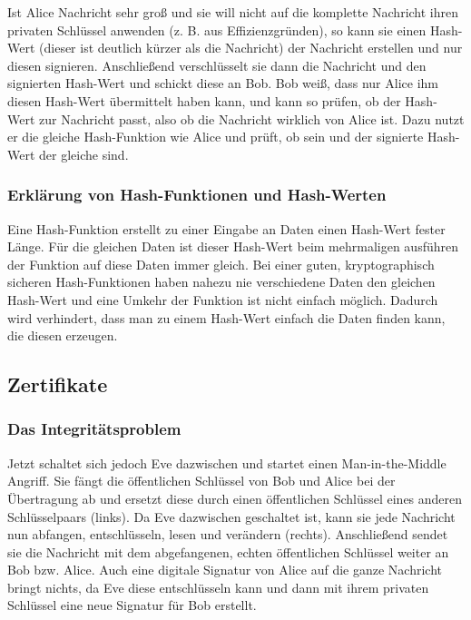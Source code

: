 Ist Alice Nachricht sehr groß und sie will nicht auf die komplette Nachricht
ihren privaten Schlüssel anwenden (z. B. aus Effizienzgründen), so kann sie
einen Hash-Wert (dieser ist deutlich kürzer als die Nachricht) der Nachricht erstellen
und nur diesen signieren. Anschließend verschlüsselt sie dann die Nachricht und
den signierten Hash-Wert und schickt diese an Bob.
Bob weiß, dass nur Alice ihm diesen Hash-Wert übermittelt haben kann, und kann so
prüfen, ob der Hash-Wert zur Nachricht passt, also ob die Nachricht wirklich von Alice
ist. Dazu nutzt er die gleiche Hash-Funktion wie Alice und prüft, ob sein und der signierte
Hash-Wert der gleiche sind.

\subsubsection{Erklärung von Hash-Funktionen und Hash-Werten}

Eine Hash-Funktion erstellt zu einer Eingabe an Daten einen Hash-Wert fester Länge.
Für die gleichen Daten ist dieser Hash-Wert beim mehrmaligen ausführen der 
Funktion auf diese Daten immer gleich.
Bei einer guten, kryptographisch sicheren Hash-Funktionen haben nahezu nie verschiedene
Daten den gleichen Hash-Wert und eine Umkehr der Funktion ist nicht einfach möglich.
Dadurch wird verhindert, dass man zu einem Hash-Wert einfach die Daten finden kann, die
diesen erzeugen.

\subsection{Zertifikate}

\subsubsection{Das Integritätsproblem}

Jetzt schaltet sich jedoch Eve dazwischen und startet einen Man-in-the-Middle Angriff.
Sie fängt die öffentlichen Schlüssel von Bob und Alice bei der Übertragung
ab und ersetzt diese durch einen öffentlichen Schlüssel eines anderen Schlüsselpaars (links).
Da Eve dazwischen geschaltet ist, kann sie jede Nachricht nun abfangen, entschlüsseln, lesen
und verändern (rechts). Anschließend sendet sie die Nachricht mit dem abgefangenen, echten öffentlichen
Schlüssel weiter an Bob bzw. Alice. Auch eine digitale Signatur von Alice auf die ganze Nachricht bringt nichts,
da Eve diese entschlüsseln kann und dann mit ihrem privaten Schlüssel eine neue
Signatur für Bob erstellt.

